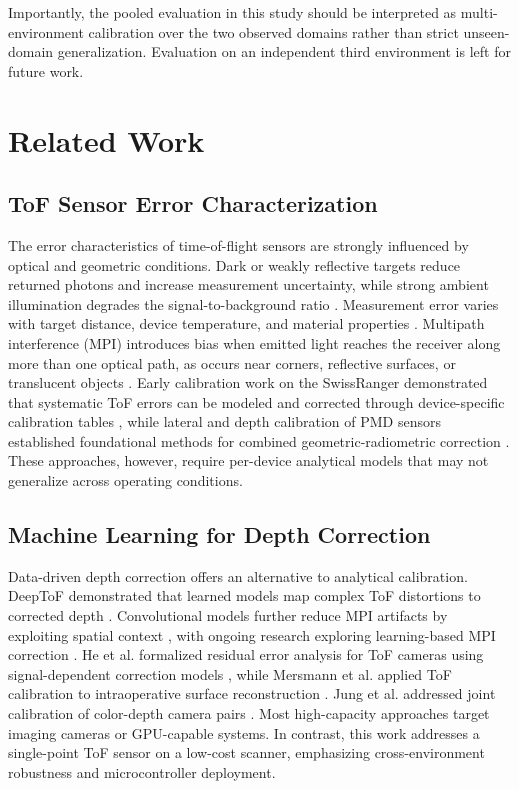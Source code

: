 \documentclass[conference, a4paper]{IEEEtran}
\begin{document}
Importantly, the pooled evaluation in this study should be interpreted as multi-environment calibration over the two observed domains rather than strict unseen-domain generalization. Evaluation on an independent third environment is left for future work.

\section{Related Work}

\subsection{ToF Sensor Error Characterization}
The error characteristics of time-of-flight sensors are strongly influenced by optical and geometric conditions. Dark or weakly reflective targets reduce returned photons and increase measurement uncertainty, while strong ambient illumination degrades the signal-to-background ratio \cite{corti2016metrological, foix2011lock, hansard2012time}. Measurement error varies with target distance, device temperature, and material properties \cite{frangez2022assessment, kahlmann2006calibration, wasenmuller2016comparison}. Multipath interference (MPI) introduces bias when emitted light reaches the receiver along more than one optical path, as occurs near corners, reflective surfaces, or translucent objects \cite{sabov2008identification, reynolds2011capturing, dorrington2011separating}. Early calibration work on the SwissRanger demonstrated that systematic ToF errors can be modeled and corrected through device-specific calibration tables \cite{kahlmann2006calibration, fuchs2008extrinsic}, while lateral and depth calibration of PMD sensors established foundational methods for combined geometric-radiometric correction \cite{lindner2006lateral}. These approaches, however, require per-device analytical models that may not generalize across operating conditions.

\subsection{Machine Learning for Depth Correction}
Data-driven depth correction offers an alternative to analytical calibration. DeepToF demonstrated that learned models map complex ToF distortions to corrected depth \cite{su2018deeptof}. Convolutional models further reduce MPI artifacts by exploiting spatial context \cite{agresti2018deep}, with ongoing research exploring learning-based MPI correction \cite{guo2021tackling}. He et al. formalized residual error analysis for ToF cameras using signal-dependent correction models \cite{he2017depth}, while Mersmann et al. applied ToF calibration to intraoperative surface reconstruction \cite{mersmann2013calibration}. Jung et al. addressed joint calibration of color-depth camera pairs \cite{jung2015tof}. Most high-capacity approaches target imaging cameras or GPU-capable systems. In contrast, this work addresses a single-point ToF sensor on a low-cost scanner, emphasizing cross-environment robustness and microcontroller deployment.
\end{document}
